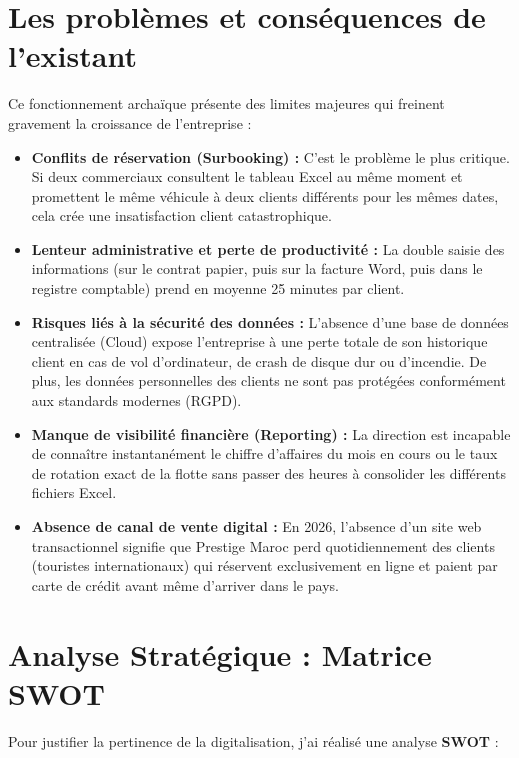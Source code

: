 \section{Les problèmes et conséquences de l'existant}
Ce fonctionnement archaïque présente des limites majeures qui freinent gravement la croissance de l'entreprise :
\begin{itemize}
    \item \textbf{Conflits de réservation (Surbooking) :} C'est le problème le plus critique. Si deux commerciaux consultent le tableau Excel au même moment et promettent le même véhicule à deux clients différents pour les mêmes dates, cela crée une insatisfaction client catastrophique.
    \item \textbf{Lenteur administrative et perte de productivité :} La double saisie des informations (sur le contrat papier, puis sur la facture Word, puis dans le registre comptable) prend en moyenne 25 minutes par client.
    \item \textbf{Risques liés à la sécurité des données :} L'absence d'une base de données centralisée (Cloud) expose l'entreprise à une perte totale de son historique client en cas de vol d'ordinateur, de crash de disque dur ou d'incendie. De plus, les données personnelles des clients ne sont pas protégées conformément aux standards modernes (RGPD).
    \item \textbf{Manque de visibilité financière (Reporting) :} La direction est incapable de connaître instantanément le chiffre d'affaires du mois en cours ou le taux de rotation exact de la flotte sans passer des heures à consolider les différents fichiers Excel.
    \item \textbf{Absence de canal de vente digital :} En 2026, l'absence d'un site web transactionnel signifie que Prestige Maroc perd quotidiennement des clients (touristes internationaux) qui réservent exclusivement en ligne et paient par carte de crédit avant même d'arriver dans le pays.
\end{itemize}

\section{Analyse Stratégique : Matrice SWOT}
Pour justifier la pertinence de la digitalisation, j'ai réalisé une analyse \textbf{SWOT} :

